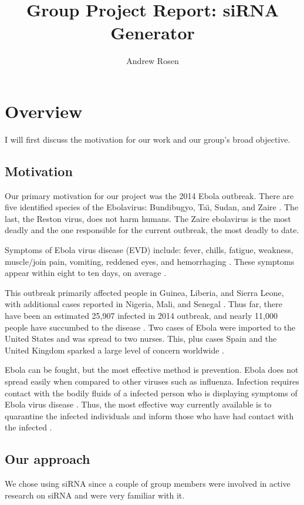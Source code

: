 \documentclass[10pt,letterpaper]{article}
\author{Andrew Rosen}
\title{Group Project Report: siRNA Generator}
\date{}
\begin{document}
\maketitle

\section{Overview}
I will first discuss the motivation for our work and our group's broad objective.


\subsection{Motivation}
Our primary motivation for our project was the 2014 Ebola outbreak.
There are five identified species of the Ebolavirus: Bundibugyo, Ta\"{\i}, Sudan, and Zaire \cite{centers20152014}.
The last, the Reston virus, does not harm humans.
The Zaire ebolavirus is the most deadly and the one responsible for the current outbreak, the most deadly to date.

Symptoms of Ebola virus disease (EVD) include: fever, chills, fatigue, weakness, muscle/join pain,  vomiting, reddened eyes, and hemorrhaging \cite{team2014ebola} \cite{wongcharacterization}.
These symptoms appear within eight to ten days, on average \cite{centers20152014}.


This outbreak primarily affected people in Guinea, Liberia, and Sierra Leone, with additional cases reported in Nigeria, Mali, and Senegal \cite{centers20152014} .
Thus far, there have been an estimated 25,907 infected in 2014 outbreak, and nearly 11,000 people have succumbed to the disease \cite{centers20152014}.
Two cases of Ebola were imported to the United States and was spread to two nurses. 
This, plus cases Spain and the United Kingdom sparked a large level of concern worldwide  \cite{levin2015ebola} \cite{ready}.


Ebola can be fought, but the most effective method is prevention.
Ebola does not spread easily when compared to other viruses such as influenza.
Infection requires contact with the bodily fluids of a infected person who is displaying symptoms of Ebola virus disease \cite{wongcharacterization} \cite{team2014ebola}.
Thus, the most effective way currently available is to quarantine the infected individuals and inform those who have had contact with the infected \cite{team2014ebola}.

\subsection{Our approach}
We chose using siRNA since a couple of group members were involved in active research on siRNA and were very familiar with it.
\end{document}
